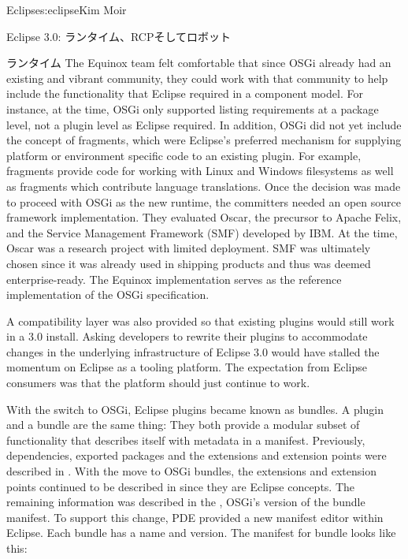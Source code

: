 \begin{aosachapter}{Eclipse}{s:eclipse}{Kim Moir}
\begin{aosasect1}{Eclipse 3.0: ランタイム、RCPそしてロボット}
\begin{aosasect2}{ランタイム}
The Equinox team felt comfortable that since OSGi already had an
existing and vibrant community, they could work with that community to
help include the functionality that Eclipse required in a component
model.  For instance, at the time, OSGi only supported listing
requirements at a package level, not a plugin level as Eclipse
required. In addition, OSGi did not yet include the concept of
fragments, which were Eclipse's preferred mechanism for supplying
platform or environment specific code to an existing plugin. For
example, fragments provide code for working with Linux and Windows
filesystems as well as fragments which contribute language
translations. Once the decision was made to proceed with OSGi as the
new runtime, the committers needed an open source framework
implementation. They evaluated Oscar, the precursor to Apache Felix,
and the Service Management Framework (SMF) developed by IBM\@. At the
time, Oscar was a research project with limited deployment.  SMF was
ultimately chosen since it was already used in shipping products and
thus was deemed enterprise-ready. The Equinox implementation serves as
the reference implementation of the OSGi specification.

A compatibility layer was also provided so that existing plugins
would still work in a 3.0 install. Asking developers to rewrite their
plugins to accommodate changes in the underlying infrastructure of
Eclipse 3.0 would have stalled the momentum on Eclipse as a tooling
platform. The expectation from Eclipse consumers was that the platform
should just continue to work.

With the switch to OSGi, Eclipse plugins became known as bundles. A
plugin and a bundle are the same thing: They both provide a modular
subset of functionality that describes itself with metadata in a
manifest.  Previously, dependencies, exported packages and the
extensions and extension points were described in .
With the move to OSGi bundles, the extensions and extension points
continued to be described in  since they are Eclipse
concepts. The remaining information was described in
the , OSGi's version of the bundle
manifest. To support this change, PDE provided a new manifest editor
within Eclipse.  Each bundle has a name and version. The manifest for
 bundle looks like this:


\end{aosasect2}
\end{aosasect1}
\end{aosachapter}
